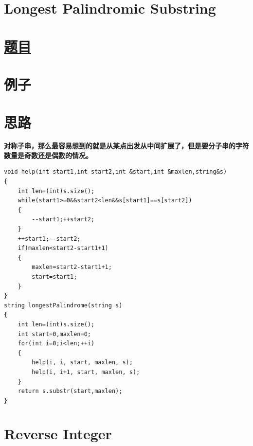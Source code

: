 \documentclass[a4paper, 11pt]{article} %
\begin{document}
\begin{spacing}{1.5}
\section{  Longest Palindromic Substring}
\section*{\href{https://leetcode.com/problems/longest-palindromic-substring/}{题目} }
  \section*{例子}

\section*{思路}
\textbf{\color{blue}对称子串，那么最容易想到的就是从某点出发从中间扩展了，但是要分子串的字符数量是奇数还是偶数的情况。}
\begin{lstlisting}[caption={},frame=shadowbox]
void help(int start1,int start2,int &start,int &maxlen,string&s)
{
    int len=(int)s.size();
    while(start1>=0&&start2<len&&s[start1]==s[start2])
    {
        --start1;++start2;
    }
    ++start1;--start2;
    if(maxlen<start2-start1+1)
    {
        maxlen=start2-start1+1;
        start=start1;
    }
}
string longestPalindrome(string s)
{
    int len=(int)s.size();
    int start=0,maxlen=0;
    for(int i=0;i<len;++i)
    {
        help(i, i, start, maxlen, s);
        help(i, i+1, start, maxlen, s);
    }
    return s.substr(start,maxlen);
}
\end{lstlisting}



\section{Reverse Integer}

\end{spacing}
\end{document}
